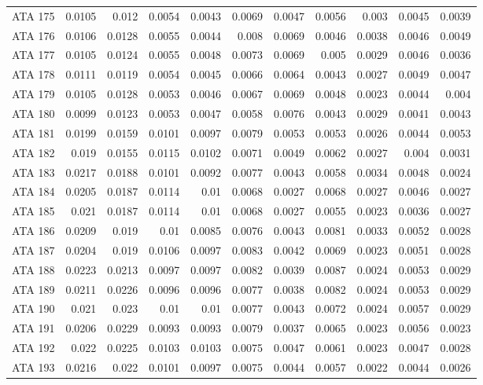 \begin{landscape}
\begin{longtable}{rrrrrrrrrrr}
  ATA 175 & 0.0105 & 0.012 & 0.0054 & 0.0043 & 0.0069 & 0.0047 & 0.0056 & 0.003 & 0.0045 & 0.0039 \\ 
  ATA 176 & 0.0106 & 0.0128 & 0.0055 & 0.0044 & 0.008 & 0.0069 & 0.0046 & 0.0038 & 0.0046 & 0.0049 \\ 
  ATA 177 & 0.0105 & 0.0124 & 0.0055 & 0.0048 & 0.0073 & 0.0069 & 0.005 & 0.0029 & 0.0046 & 0.0036 \\ 
  ATA 178 & 0.0111 & 0.0119 & 0.0054 & 0.0045 & 0.0066 & 0.0064 & 0.0043 & 0.0027 & 0.0049 & 0.0047 \\ 
  ATA 179 & 0.0105 & 0.0128 & 0.0053 & 0.0046 & 0.0067 & 0.0069 & 0.0048 & 0.0023 & 0.0044 & 0.004 \\ 
  ATA 180 & 0.0099 & 0.0123 & 0.0053 & 0.0047 & 0.0058 & 0.0076 & 0.0043 & 0.0029 & 0.0041 & 0.0043 \\ 
  ATA 181 & 0.0199 & 0.0159 & 0.0101 & 0.0097 & 0.0079 & 0.0053 & 0.0053 & 0.0026 & 0.0044 & 0.0053 \\ 
  ATA 182 & 0.019 & 0.0155 & 0.0115 & 0.0102 & 0.0071 & 0.0049 & 0.0062 & 0.0027 & 0.004 & 0.0031 \\ 
  ATA 183 & 0.0217 & 0.0188 & 0.0101 & 0.0092 & 0.0077 & 0.0043 & 0.0058 & 0.0034 & 0.0048 & 0.0024 \\ 
  ATA 184 & 0.0205 & 0.0187 & 0.0114 & 0.01 & 0.0068 & 0.0027 & 0.0068 & 0.0027 & 0.0046 & 0.0027 \\ 
  ATA 185 & 0.021 & 0.0187 & 0.0114 & 0.01 & 0.0068 & 0.0027 & 0.0055 & 0.0023 & 0.0036 & 0.0027 \\ 
  ATA 186 & 0.0209 & 0.019 & 0.01 & 0.0085 & 0.0076 & 0.0043 & 0.0081 & 0.0033 & 0.0052 & 0.0028 \\ 
  ATA 187 & 0.0204 & 0.019 & 0.0106 & 0.0097 & 0.0083 & 0.0042 & 0.0069 & 0.0023 & 0.0051 & 0.0028 \\ 
  ATA 188 & 0.0223 & 0.0213 & 0.0097 & 0.0097 & 0.0082 & 0.0039 & 0.0087 & 0.0024 & 0.0053 & 0.0029 \\ 
  ATA 189 & 0.0211 & 0.0226 & 0.0096 & 0.0096 & 0.0077 & 0.0038 & 0.0082 & 0.0024 & 0.0053 & 0.0029 \\ 
  ATA 190 & 0.021 & 0.023 & 0.01 & 0.01 & 0.0077 & 0.0043 & 0.0072 & 0.0024 & 0.0057 & 0.0029 \\ 
  ATA 191 & 0.0206 & 0.0229 & 0.0093 & 0.0093 & 0.0079 & 0.0037 & 0.0065 & 0.0023 & 0.0056 & 0.0023 \\ 
  ATA 192 & 0.022 & 0.0225 & 0.0103 & 0.0103 & 0.0075 & 0.0047 & 0.0061 & 0.0023 & 0.0047 & 0.0028 \\ 
  ATA 193 & 0.0216 & 0.022 & 0.0101 & 0.0097 & 0.0075 & 0.0044 & 0.0057 & 0.0022 & 0.0044 & 0.0026 \\ 

\end{longtable}
\end{landscape}
